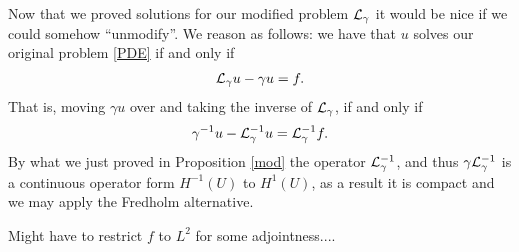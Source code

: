 \documentclass[12pt]{article}
\newcommand{\red}[1]{{\color{red}#1}}
\begin{document}
Now that we proved solutions for our modified problem $\mathcal{L}_\gamma $ it would be nice if we could somehow ``unmodify''. We reason as follows: we have that $u$ solves our original problem  \eqref{PDE} if and only if
\begin{align*}
	\mathcal{L}_\gamma u - \gamma  u =f.
\end{align*}
That is, moving $\gamma  u$ over and taking the inverse of $\mathcal{L}_\gamma $, if and only if
\begin{align*}
	\gamma^{-1}u -\mathcal{L}_\gamma ^{-1} u = \mathcal{L}_\gamma ^{-1}f.
\end{align*}
By what we just proved in Proposition \ref{mod} the operator $\mathcal{L}_\gamma^{-1}$, and thus $ \gamma \mathcal{L}_\gamma ^{-1}$ is a continuous operator form $H^{-1}(U)$ to  $H^{1}(U)$, as a result it is compact and we may apply the Fredholm alternative.

\red{Might have to restrict $f$ to  $L^2$ for some adjointness....}

\appendix



\end{document}
